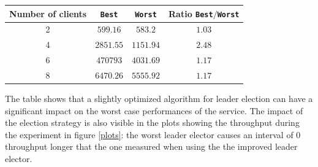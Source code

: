 \documentclass[a4paper, 10pt]{article}
\begin{document}
\begin{center}
\begin{tabular}{c|c|c|c}\label{totals}
    Number of clients & \texttt{Best} & \texttt{Worst} & Ratio \texttt{Best}$/$\texttt{Worst} \\ \hline
    2 & $599.16$ & $583.2$ & $1.03$    \\
    4 & $2851.55$ & $1151.94$ & $2.48$ \\
    6 & $470793$ & $4031.69$ & $1.17$  \\
    8 & $6470.26$ & $5555.92$ & $1.17$
\end{tabular}
\end{center}
The table shows that a slightly optimized algorithm for leader election can have a significant impact on the worst case performances of the service.
The impact of the election strategy is also visible in the plots showing the throughput during the experiment in figure \ref{plots}: the worst leader elector causes an interval of 0 throughput longer that the one measured when using the the improved leader elector.
\end{document}
